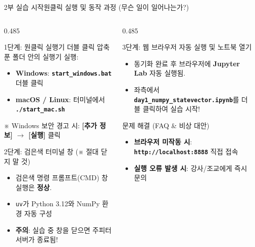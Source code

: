 \documentclass[aspectratio=169, 10pt]{beamer}
\begin{document}
\begin{frame}{2부 실습 시작}{원클릭 실행 및 동작 과정 (무슨 일이 일어나는가?)}
    \begin{columns}[t]
        \begin{column}{0.485\textwidth}
            \begin{block}{1단계: 원클릭 실행기 더블 클릭}
                압축 푼 폴더 안의 실행기 실행:
                \begin{itemize}
                    \item \textbf{Windows}: \texttt{\textbf{start\_windows.bat}} 더블 클릭
                    \item \textbf{macOS / Linux}: 터미널에서 \texttt{\textbf{./start\_mac.sh}}
                \end{itemize}
                \vspace{0.02cm}
                {\tiny ※ Windows 보안 경고 시: \textbf{[추가 정보] $\to$ [실행]} 클릭}
            \end{block}
            \vspace{0.04cm}
            \begin{alertblock}{2단계: 검은색 터미널 창 (※ 절대 닫지 말 것)}
                \begin{itemize}
                    \item 검은색 명령 프롬프트(CMD) 창 실행은 \textbf{정상}.
                    \item \texttt{uv}가 Python 3.12와 NumPy 환경 자동 구성
                    \item \textbf{주의}: 실습 중 창을 닫으면 주피터 서버가 종료됨!
                \end{itemize}
            \end{alertblock}
        \end{column}
        \begin{column}{0.485\textwidth}
            \begin{block}{3단계: 웹 브라우저 자동 실행 및 노트북 열기}
                \begin{itemize}
                    \item 동기화 완료 후 브라우저에 \textbf{Jupyter Lab} 자동 실행됨.
                    \item 좌측에서 \texttt{\textbf{day1\_numpy\_statevector.ipynb}}를 더블 클릭하여 실습 시작!
                \end{itemize}
            \end{block}
            \begin{exampleblock}{문제 해결 (FAQ \& 비상 대안)}
                \begin{itemize}
                    \item \textbf{브라우저 미작동 시}: \texttt{\textbf{http://localhost:8888}} 직접 접속
                    \item \textbf{실행 오류 발생 시}: 강사/조교에게 즉시 문의
                \end{itemize}
            \end{exampleblock}
        \end{column}
    \end{columns}
\end{frame}
\end{document}
